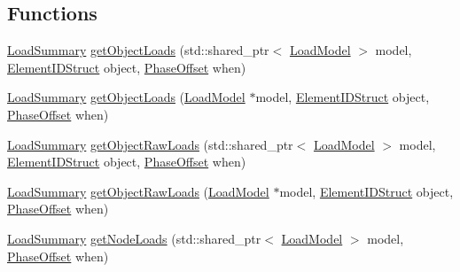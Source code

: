\subsection*{Functions}
\begin{DoxyCompactItemize}
\item 
\hyperlink{structvt_1_1vrt_1_1collection_1_1balance_1_1_load_summary}{Load\+Summary} \hyperlink{namespacevt_1_1vrt_1_1collection_1_1balance_ae3bc5e1c68d2f55908748501fcba9146}{get\+Object\+Loads} (std\+::shared\+\_\+ptr$<$ \hyperlink{structvt_1_1vrt_1_1collection_1_1balance_1_1_load_model}{Load\+Model} $>$ model, \hyperlink{namespacevt_1_1vrt_1_1collection_1_1balance_a9f5b53fafb270212279a4757d2c4cd28}{Element\+I\+D\+Struct} object, \hyperlink{structvt_1_1vrt_1_1collection_1_1balance_1_1_phase_offset}{Phase\+Offset} when)
\item 
\hyperlink{structvt_1_1vrt_1_1collection_1_1balance_1_1_load_summary}{Load\+Summary} \hyperlink{namespacevt_1_1vrt_1_1collection_1_1balance_a5e4d4bdd2fceaebcb89d669b8a1b2361}{get\+Object\+Loads} (\hyperlink{structvt_1_1vrt_1_1collection_1_1balance_1_1_load_model}{Load\+Model} $\ast$model, \hyperlink{namespacevt_1_1vrt_1_1collection_1_1balance_a9f5b53fafb270212279a4757d2c4cd28}{Element\+I\+D\+Struct} object, \hyperlink{structvt_1_1vrt_1_1collection_1_1balance_1_1_phase_offset}{Phase\+Offset} when)
\item 
\hyperlink{structvt_1_1vrt_1_1collection_1_1balance_1_1_load_summary}{Load\+Summary} \hyperlink{namespacevt_1_1vrt_1_1collection_1_1balance_a458d9ee80526c682a9ece08ec4073ec8}{get\+Object\+Raw\+Loads} (std\+::shared\+\_\+ptr$<$ \hyperlink{structvt_1_1vrt_1_1collection_1_1balance_1_1_load_model}{Load\+Model} $>$ model, \hyperlink{namespacevt_1_1vrt_1_1collection_1_1balance_a9f5b53fafb270212279a4757d2c4cd28}{Element\+I\+D\+Struct} object, \hyperlink{structvt_1_1vrt_1_1collection_1_1balance_1_1_phase_offset}{Phase\+Offset} when)
\item 
\hyperlink{structvt_1_1vrt_1_1collection_1_1balance_1_1_load_summary}{Load\+Summary} \hyperlink{namespacevt_1_1vrt_1_1collection_1_1balance_a05566d60449203a260750b0ab3ab2834}{get\+Object\+Raw\+Loads} (\hyperlink{structvt_1_1vrt_1_1collection_1_1balance_1_1_load_model}{Load\+Model} $\ast$model, \hyperlink{namespacevt_1_1vrt_1_1collection_1_1balance_a9f5b53fafb270212279a4757d2c4cd28}{Element\+I\+D\+Struct} object, \hyperlink{structvt_1_1vrt_1_1collection_1_1balance_1_1_phase_offset}{Phase\+Offset} when)
\item 
\hyperlink{structvt_1_1vrt_1_1collection_1_1balance_1_1_load_summary}{Load\+Summary} \hyperlink{namespacevt_1_1vrt_1_1collection_1_1balance_a3e23892df34e34f78bfa995cad0aa98e}{get\+Node\+Loads} (std\+::shared\+\_\+ptr$<$ \hyperlink{structvt_1_1vrt_1_1collection_1_1balance_1_1_load_model}{Load\+Model} $>$ model, \hyperlink{structvt_1_1vrt_1_1collection_1_1balance_1_1_phase_offset}{Phase\+Offset} when)

\end{DoxyCompactItemize}
